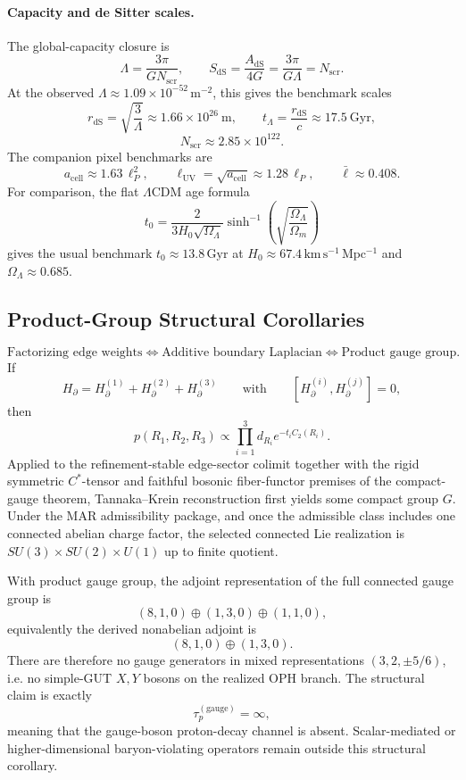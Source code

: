 \paragraph{Capacity and de Sitter scales.}
The global-capacity closure is
\[
\Lambda=\frac{3\pi}{G N_{\mathrm{scr}}},
\qquad
S_{\mathrm{dS}}=\frac{A_{\mathrm{dS}}}{4G}=\frac{3\pi}{G\Lambda}=N_{\mathrm{scr}}.
\]
At the observed \(\Lambda\approx 1.09\times 10^{-52}\,\mathrm{m^{-2}}\), this gives the benchmark
scales
\[
r_{\mathrm{dS}}=\sqrt{\frac{3}{\Lambda}}\approx 1.66\times 10^{26}\ \mathrm{m},
\qquad
t_\Lambda=\frac{r_{\mathrm{dS}}}{c}\approx 17.5\ \mathrm{Gyr},
\]
\[
N_{\mathrm{scr}}\approx 2.85\times 10^{122}.
\]
The companion pixel benchmarks are
\[
a_{\mathrm{cell}}\approx 1.63\,\ell_P^2,
\qquad
\ell_{\mathrm{UV}}=\sqrt{a_{\mathrm{cell}}}\approx 1.28\,\ell_P,
\qquad
\bar{\ell}\approx 0.408.
\]
For comparison, the flat \(\Lambda\)CDM age formula
\[
t_0=\frac{2}{3H_0\sqrt{\Omega_\Lambda}}
\sinh^{-1}\!\left(\sqrt{\frac{\Omega_\Lambda}{\Omega_m}}\right)
\]
gives the usual benchmark \(t_0\approx 13.8\,\mathrm{Gyr}\) at
\(H_0\approx 67.4\,\mathrm{km\,s^{-1}\,Mpc^{-1}}\) and \(\Omega_\Lambda\approx 0.685\).

\subsection{Product-Group Structural Corollaries}

\begin{theorem}
\[
\text{Factorizing edge weights}
\Longleftrightarrow
\text{Additive boundary Laplacian}
\Longleftrightarrow
\text{Product gauge group}.
\]
If
\[
H_\partial=H_\partial^{(1)}+H_\partial^{(2)}+H_\partial^{(3)}
\qquad\text{with}\qquad
[H_\partial^{(i)},H_\partial^{(j)}]=0,
\]
then
\[
p(R_1,R_2,R_3)\propto\prod_{i=1}^3 d_{R_i}e^{-t_iC_2(R_i)}.
\]
Applied to the refinement-stable edge-sector colimit together with the rigid symmetric
\(C^*\)-tensor and faithful bosonic fiber-functor premises of the compact-gauge theorem,
Tannaka--Krein reconstruction first yields some compact group \(G\). Under the MAR admissibility
package, and once the admissible class includes one connected abelian charge factor, the selected
connected Lie realization is \(SU(3)\times SU(2)\times U(1)\) up to finite quotient.
\end{theorem}

\begin{corollary}
With product gauge group, the adjoint representation of the full connected gauge group is
\[
(8,1,0)\oplus(1,3,0)\oplus(1,1,0),
\]
equivalently the derived nonabelian adjoint is
\[
(8,1,0)\oplus(1,3,0).
\]
There are therefore no gauge generators in mixed representations \((3,2,\pm 5/6)\), i.e. no
simple-GUT \(X,Y\) bosons on the realized OPH branch. The structural claim is exactly
\[
\tau_p^{(\mathrm{gauge})}=\infty,
\]
meaning that the gauge-boson proton-decay channel is absent. Scalar-mediated or
higher-dimensional baryon-violating operators remain outside this structural corollary.
\end{corollary}

